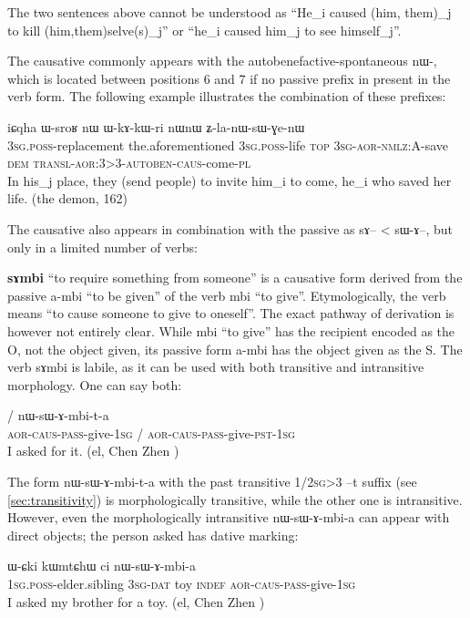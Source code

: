 \documentclass[oldfontcommands,oneside,a4paper,11pt]{memoir}
\newcommand{\ipa}[1]{{\phon #1}} %
\newcommand{\wav}[1]{}%
\newcommand{\aor}{\textsc{aor}}
\newcommand{\auto}{\textsc{autoben}}
\newcommand{\caus}{\textsc{caus}}
\newcommand{\dat}{\textsc{dat}}
\newcommand{\dem}{\textsc{dem}}
\newcommand{\indef}{\textsc{indef}}
\newcommand{\nmlz}{\textsc{nmlz}}
\newcommand{\pl}{\textsc{pl}}
\newcommand{\pass}{\textsc{pass}}
\newcommand{\poss}{\textsc{poss}}
\newcommand{\pst}{\textsc{pst}}
\newcommand{\sg}{\textsc{sg}}
\newcommand{\topic}{\textsc{top}}
\newcommand{\transloc}{\textsc{transl}}
\begin{document}
The two sentences above cannot be understood as  ``He_i caused (him, them)_j to kill (him,them)selve(s)_j'' or ``he_i caused him_j to see himself_j''.


The causative commonly appears with the autobenefactive-spontaneous \ipa{nɯ-}, which is located between positions 6 and 7 if no passive prefix in present in the verb form. The following example illustrates the combination of these prefixes:


 \begin{exe}
\ex 
\gll \ipa{ɯ-sci} 	\ipa{iɕqha} 	\ipa{ɯ-sroʁ} 	\ipa{nɯ} 	\ipa{ɯ-kɤ-kɯ-ri} 	\ipa{nɯnɯ} \ipa{ʑ-la-nɯ-sɯ-ɣe-nɯ} \\
3\sg{}.\poss{}-replacement the.aforementioned 3\sg{}.\poss{}-life \topic{} 3\sg{}-\aor{}-\nmlz{}:A-save \dem{} \transloc{}-\aor{}:3>3-\auto{}-\caus{}-come-\pl{} \\
\glt In his_j place, they (send people) to invite him_i to come, he_i who saved her life.    (the demon, 162)
\end{exe}

 The causative also appears in combination with the passive as \ipa{sɤ}-- < \ipa{sɯ-ɤ}--, but only in a limited number of verbs:
 
 
  \textbf{\ipa{sɤmbi}} ``to require something from someone'' is a causative form derived from the passive \ipa{a-mbi} ``to be given'' of the verb \ipa{mbi} ``to give''. Etymologically, the verb means ``to cause someone to give to oneself''. The exact pathway of derivation is however not entirely clear. While \ipa{mbi} ``to give'' has the recipient encoded as the O, not the object given, its passive form \ipa{a-mbi} has the object given as the S. The verb   \ipa{sɤmbi} is labile, as it can be used with both transitive and intransitive morphology. One can say both:
   \begin{exe}
\ex
\gll   \ipa{nɯ-sɯ-ɤ-mbi-a}  / \ipa{nɯ-sɯ-ɤ-mbi-t-a}\\
\aor{}-\caus{}-\pass{}-give-1\sg{} /  \aor{}-\caus{}-\pass{}-give-\pst{}-1\sg{} \\
 \glt I asked for it. (el, Chen Zhen \wav{8_sAmbi})
\end{exe}   
  The form \ipa{nɯ-sɯ-ɤ-mbi-t-a} with the past transitive 1/2\sg{}>3 --\ipa{t} suffix (see \ref{sec:transitivity}) is morphologically transitive, while the other one is intransitive. However, even the morphologically intransitive \ipa{nɯ-sɯ-ɤ-mbi-a} can appear with direct objects; the person asked has dative marking:
    \begin{exe}
\ex
\gll \ipa{a-pi} 	\ipa{ɯ-ɕki} 	\ipa{kɯmtɕhɯ} 	\ipa{ci}   \ipa{nɯ-sɯ-ɤ-mbi-a}    \\
1\sg{}.\poss{}-elder.sibling 3\sg{}-\dat{} toy \indef{} \aor{}-\caus{}-\pass{}-give-1\sg{}   \\
 \glt I asked my brother for a toy. (el, Chen Zhen \wav{8_sAmbi})
\end{exe}   
  
\end{document}
